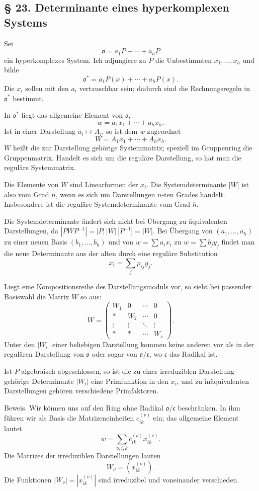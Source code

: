 \documentclass[11pt]{article}
\providecommand{\mo}{\mathfrak{o}}
\providecommand{\mc}{\mathfrak{c}}
\begin{document}
\subsection*{§ 23. Determinante eines hyperkomplexen Systems}
Sei
\[
        \mo=a_1P+\cdots+a_hP
\]
ein hyperkomplexes System. Ich adjungiere zu $P$ die Unbestimmten $x_1,\ldots,x_h$ und bilde
\[
        \mo^*=a_1P(x)+\cdots+a_hP(x).
\]
Die $x_i$ sollen mit den $a_i$ vertauschbar sein; dadurch sind die Rechnungsregeln in $\mo^*$ bestimmt.

In $\mo^*$ liegt das allgemeine Element von $\mo$,
\[
        w=a_1x_1+\cdots+a_hx_h.
\]
Ist in einer Darstellung $a_i\mapsto A_i$, so ist dem $w$ zugeordnet
\[
        W=A_1x_1+\cdots+A_hx_h.
\]
$W$ heißt die zur Darstellung gehörige Systemmatrix; speziell im Gruppenring die Gruppenmatrix. Handelt es sich um die reguläre Darstellung, so hat man die reguläre Systemmatrix.

Die Elemente von $W$ sind Linearformen der $x_i$. Die Systemdeterminante $|W|$ ist also vom Grad $n$, wenn es sich um Darstellungen $n$-ten Grades handelt. Insbesondere ist die reguläre Systemdeterminante vom Grad $h$.

Die Systemdeterminante ändert sich nicht bei Übergang zu äquivalenten Darstellungen, da $|PWP^{-1}|=|P|\,|W|\,|P^{-1}|=|W|$. Bei Übergang von $(a_1,\ldots,a_h)$ zu einer neuen Basis $(b_1,\ldots,b_h)$ und von $w=\sum a_ix_i$ zu $w=\sum b_jy_j$ findet man die neue Determinante aus der alten durch eine reguläre Substitution
\[
        x_i=\sum_j\rho_{ij}y_j.
\]

Liegt eine Kompositionsreihe des Darstellungsmoduls vor, so sieht bei passender Basiswahl die Matrix $W$ so aus:
\[
        W=\begin{pmatrix}
        W_1&0&\cdots&0\\
        *&W_2&\cdots&0\\
        \vdots&\vdots&\ddots&\vdots\\
        *&*&\cdots&W_s
        \end{pmatrix}.
\]
Unter den $|W_i|$ einer beliebigen Darstellung kommen keine anderen vor als in der regulären Darstellung von $\mo$ oder sogar von $\mo/\mc$, wo $\mc$ das Radikal ist.

Ist $P$ algebraisch abgeschlossen, so ist die zu einer irreduziblen Darstellung gehörige Determinante $|W_i|$ eine Primfunktion in den $x_i$, und zu inäquivalenten Darstellungen gehören verschiedene Primfaktoren.

Beweis. Wir können uns auf den Ring ohne Radikal $\mo/\mc$ beschränken. In ihm führen wir als Basis die Matrizeneinheiten $c_{ik}^{(\nu)}$ ein; das allgemeine Element lautet
\[
        w=\sum_{\nu,i,k}c_{ik}^{(\nu)}x_{ik}^{(\nu)}.
\]
Die Matrizes der irreduziblen Darstellungen lauten
\[
        W_\nu=(x_{ik}^{(\nu)}).
\]
Die Funktionen $|W_\nu|=|x_{ik}^{(\nu)}|$ sind irreduzibel und voneinander verschieden.
\end{document}
